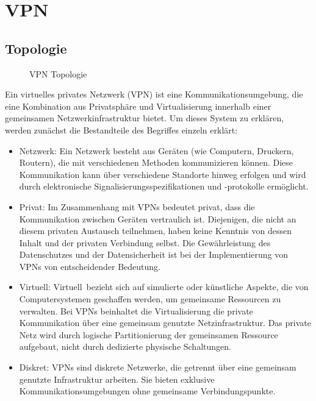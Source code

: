 \section{VPN}
\label{chap:vpn}

\subsection{Topologie}
\label{chap:vpn_topology}

\begin{figure}[h!]
    \centering
    
    \caption{VPN Topologie}
    \label{imgs:vpn}
\end{figure}

Ein virtuelles privates Netzwerk (VPN) ist eine Kommunikationsumgebung, die eine Kombination aus Privatsphäre und Virtualisierung innerhalb einer gemeinsamen Netzwerkinfrastruktur bietet. Um dieses System zu erklären, werden zunächst die Bestandteile des Begriffes einzeln erklärt:

\begin{itemize}
    \item Netzwerk: Ein Netzwerk besteht aus Geräten (wie Computern, Druckern, Routern), die mit verschiedenen Methoden kommunizieren können. Diese Kommunikation kann über verschiedene Standorte hinweg erfolgen und wird durch elektronische Signalisierungsspezifikationen und -protokolle ermöglicht.
    \item Privat: Im Zusammenhang mit VPNs bedeutet \glqq privat\grqq, dass die Kommunikation zwischen Geräten vertraulich ist. Diejenigen, die nicht an diesem privaten Austausch teilnehmen, haben keine Kenntnis von dessen Inhalt und der privaten Verbindung selbst. Die Gewährleistung des Datenschutzes und der Datensicherheit ist bei der Implementierung von VPNs von entscheidender Bedeutung.
    \item Virtuell: \glqq Virtuell\grqq\ bezieht sich auf simulierte oder künstliche Aspekte, die von Computersystemen geschaffen werden, um gemeinsame Ressourcen zu verwalten. Bei VPNs beinhaltet die Virtualisierung die private Kommunikation über eine gemeinsam genutzte Netzinfrastruktur. Das private Netz wird durch logische Partitionierung der gemeinsamen Ressource aufgebaut, nicht durch dedizierte physische Schaltungen.
    \item Diskret: VPNs sind diskrete Netzwerke, die getrennt über eine gemeinsam genutzte Infrastruktur arbeiten. Sie bieten exklusive Kommunikationsumgebungen ohne gemeinsame Verbindungspunkte.
\end{itemize}

